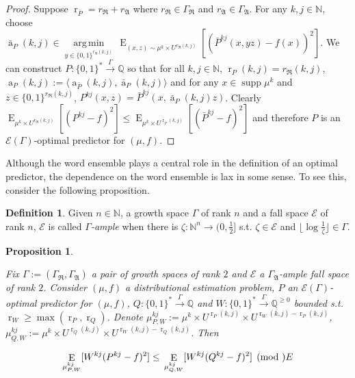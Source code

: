\documentclass{article}
\numberwithin{equation}{section}
\theoremstyle{definition}
\newtheorem{definition}{Definition}[section]
\theoremstyle{plain}
\newtheorem{proposition}{Proposition}[section]
\newcommand{\Words}{{\{ 0, 1 \}^*}}
\newcommand{\WordsLen}[1]{{\{ 0, 1 \}^{#1}}}
\DeclareMathOperator{\Supp}{supp}
\DeclareMathOperator{\E}{E}
\DeclareMathOperator{\R}{r}
\DeclareMathOperator{\A}{a}
\newcommand{\Argmin}[1]{\underset{#1}{\operatorname{arg\,min}}\,}
\newcommand{\Nats}{\mathbb{N}}
\newcommand{\Rats}{\mathbb{Q}}
\newcommand{\Floor}[1]{\lfloor #1 \rfloor}
\newcommand{\Chev}[1]{\langle #1 \rangle}
\newcommand{\GrowR}{\Gamma_{\mathfrak{R}}}
\newcommand{\GrowA}{\Gamma_{\mathfrak{A}}}
\newcommand{\Grow}{\Gamma:=(\GrowR,\GrowA)}
\newcommand{\Fall}{\mathcal{E}}
\newcommand{\Scheme}{\xrightarrow{\Gamma}}
\begin{document}
\begin{proof}

Suppose $\R_{\bar{P}}=r_{\mathfrak{R}}+r_{\mathfrak{A}}$ where $r_{\mathfrak{R}} \in \GrowR$ and $r_{\mathfrak{A}} \in \GrowA$. For any ${k,j \in \Nats}$, choose ${\bar{\A}_P(k,j) \in \Argmin{y \in \WordsLen{r_{\mathfrak{A}}(k,j)}} \E_{(x,z) \sim \mu^k \times U^{r_{\mathfrak{R}}(k,j)}}[(\bar{P}^{kj}(x,yz) - f(x))^2]}$. We can construct $P: \Words \Scheme \Rats$ so that for all $k,j \in \Nats$, $\R_P(k,j) = r_{\mathfrak{R}}(k,j)$, $\A_P(k,j):=\Chev{\A_{\bar{P}}(k,j),\bar{\A}_P(k,j)}$ and for any $x \in \Supp \mu^k$ and $z \in \WordsLen{r_{\mathfrak{R}}(k,j)}$, ${P^{kj}(x,z)=\bar{P}^{kj}(x,\bar{\A}_P(k,j)z)}$. Clearly ${\E_{\mu^k \times U^{r_{\mathfrak{R}}(k,j)}}[(P^{kj} - f)^2] \leq \E_{\mu^k \times U^{\R_{\bar{P}}(k,j)}}[(\bar{P}^{kj} - f)^2]}$ and therefore $P$ is an $\Fall(\Gamma)$-optimal predictor for $(\mu,f)$.

\end{proof}

Although the word ensemble plays a central role in the definition of an optimal predictor, the dependence on the word ensemble is lax in some sense. To see this, consider the following proposition.

\begin{definition}

Given $n \in \Nats$, a growth space $\Gamma$ of rank $n$ and a fall space $\Fall$ of rank $n$, $\Fall$ is called \emph{$\Gamma$-ample} when there is $\zeta: \Nats^n \rightarrow (0,\frac{1}{2}]$ s.t.  $\zeta \in \Fall$ and $\Floor{\log \frac{1}{\zeta}} \in \Gamma$.

\end{definition}

\begin{proposition}
\label{prp:weight}

Fix $\Grow$ a pair of growth spaces of rank $2$ and $\Fall$ a $\GrowA$-ample fall space of rank $2$. Consider $(\mu,f)$ a distributional estimation problem, $P$ an $\Fall(\Gamma)$-optimal predictor for $(\mu,f)$, $Q: \Words \Scheme \Rats$ and ${W: \Words \Scheme \Rats^{\geq 0}}$ bounded s.t. $\R_W \geq \max(\R_P, \R_Q)$. Denote ${\mu^{kj}_{P,W}:=\mu^k \times U^{\R_P(k,j)} \times U^{\R_W(k,j)-\R_P(k,j)}}$, ${\mu^{kj}_{Q,W}:=\mu^k \times U^{\R_Q(k,j)} \times U^{\R_W(k,j)-\R_Q(k,j)}}$. Then

\begin{equation}
\E_{\mu^{kj}_{P,W}}[W^{kj}(P^{kj} - f)^2] \leq \\ \E_{\mu^{kj}_{Q,W}}[W^{kj}(Q^{kj} - f)^2] \pmod \Fall
\end{equation}

\end{proposition}
\end{document}

